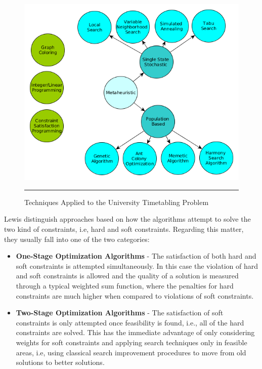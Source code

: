 \begin{figure}[th]
	\centering
	    \includegraphics[scale=0.5]{./Figures/DataStructures/yED/techniques.png}
	\rule{35em}{0.5pt}
	\caption[Techniques Applied to the University Timetabling Problem]{Techniques Applied to the University Timetabling Problem} 
	\label{fig:techniques}
\end{figure}

Lewis \citep{lewis2008survey} distinguish approaches based on how the algorithms attempt to solve the two kind of constraints, i.e, hard and soft constraints. Regarding this matter, they usually fall into one of the two categories:
\begin{itemize}
	\item{\textbf{One-Stage Optimization Algorithms}} - The satisfaction of both hard and soft constraints is attempted simultaneously. In this case the violation of hard and soft constraints is allowed and the quality of a solution is measured through a typical weighted sum function, where the penalties for hard constraints are much higher when compared to violations of soft constraints. 
	\item{\textbf{Two-Stage Optimization Algorithms}} - The satisfaction of soft constraints is only attempted once feasibility is found, i.e., all of the hard constraints are solved. This has the immediate advantage of only considering weights for soft constraints and applying search techniques only in feasible areas, i.e, using classical search improvement procedures to move from old solutions to better solutions.
\end{itemize}

